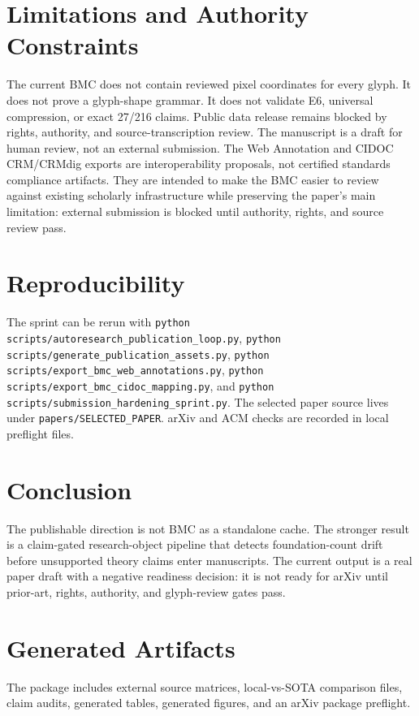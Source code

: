 \documentclass[manuscript]{acmart}
\begin{document}
\section{Limitations and Authority Constraints}
The current BMC does not contain reviewed pixel coordinates for every glyph. It does not prove a glyph-shape grammar. It does not validate E6, universal compression, or exact 27/216 claims. Public data release remains blocked by rights, authority, and source-transcription review. The manuscript is a draft for human review, not an external submission. The Web Annotation and CIDOC CRM/CRMdig exports are interoperability proposals, not certified standards compliance artifacts. They are intended to make the BMC easier to review against existing scholarly infrastructure while preserving the paper's main limitation: external submission is blocked until authority, rights, and source review pass.

\section{Reproducibility}
The sprint can be rerun with \texttt{python scripts/autoresearch\_publication\_loop.py}, \texttt{python scripts/generate\_publication\_assets.py}, \texttt{python scripts/export\_bmc\_web\_annotations.py}, \texttt{python scripts/export\_bmc\_cidoc\_mapping.py}, and \texttt{python scripts/submission\_hardening\_sprint.py}. The selected paper source lives under \texttt{papers/SELECTED\_PAPER}. arXiv and ACM checks are recorded in local preflight files.



\section{Conclusion}
The publishable direction is not BMC as a standalone cache. The stronger result is a claim-gated research-object pipeline that detects foundation-count drift before unsupported theory claims enter manuscripts. The current output is a real paper draft with a negative readiness decision: it is not ready for arXiv until prior-art, rights, authority, and glyph-review gates pass.




\appendix
\section{Generated Artifacts}
The package includes external source matrices, local-vs-SOTA comparison files, claim audits, generated tables, generated figures, and an arXiv package preflight.
\end{document}
